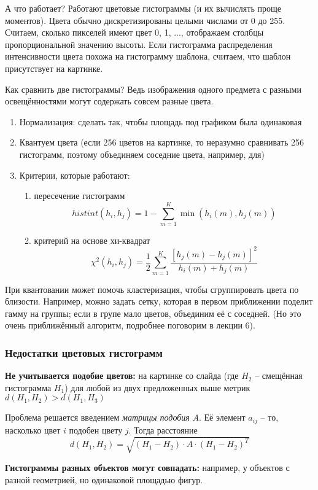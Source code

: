 \documentclass[main.tex]{subfiles}
\begin{document}
А что работает?
Работают цветовые гистограммы (и их вычислять проще моментов).
Цвета обычно дискретизированы целыми числами от 0 до 255.
Считаем, сколько пикселей имеют цвет 0, 1, ..., отображаем столбцы пропорциональной значению высоты.
Если гистограмма распределения интенсивности цвета похожа на гистограмму шаблона, считаем, что шаблон присутствует на картинке.

Как сравнить две гистограммы?
Ведь изображения одного предмета с разными освещённостями могут содержать совсем разные цвета.
\begin{enumerate}[noitemsep]
	\item Нормализация: сделать так, чтобы площадь под графиком была одинаковая
	\item Квантуем цвета (если 256 цветов на картинке, то неразумно сравнивать 256 гистограмм, поэтому объединяем соседние цвета, например, для)
	\item Критерии, которые работают:
	\begin{enumerate}[noitemsep]
		\item пересечение гистограмм 
		$$ histint(h_i, h_j) = 1 - \sum_{m=1}^K \min (h_i(m), h_j(m)) $$
		\item критерий на основе хи-квадрат
		$$ \chi^2(h_i,h_j) = \frac{1}{2} \sum_{m=1}^{K} \frac{[h_j(m)-h_j(m)]^2}{h_i(m)+h_j(m)} $$
	\end{enumerate}
	
\end{enumerate}

При квантовании может помочь кластеризация, чтобы сгруппировать цвета по близости.
Например, можно задать сетку, которая в первом приближении поделит гамму на группы; если в групе мало цветов, объединим её с соседней.
(Но это очень приближённый алгоритм, подробнее поговорим в лекции 6).

\subsubsection{Недостатки цветовых гистограмм}

\textbf{Не учитывается подобие цветов:} на картинке со слайда (где $H_2$ -- смещённая гистограмма $H_1$)  для любой из двух предложенных выше метрик $d(H_1, H_2) > d(H_1, H_3)$

Проблема решается введением \emph{матрицы подобия} $A$.
Её элемент $a_{ij}$ -- то, насколько цвет $i$ подобен цвету $j$.
Тогда расстояние 
$$ d(H_1, H_2) = \sqrt{(H_1 - H_2) \cdot A \cdot (H_1 - H_2)^T} $$

\textbf{Гистограммы разных объектов могут совпадать:} например, у объектов с разной геометрией, но одинаковой площадью фигур.
\end{document}
